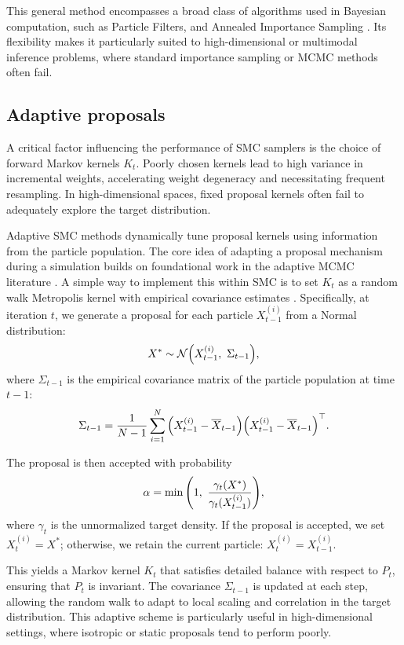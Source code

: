 \documentclass[a4paper, 12pt]{article}
\begin{document}
    This general method encompasses a broad class of algorithms used in Bayesian computation, such as Particle Filters, and Annealed Importance Sampling \citep{Neal2001}. Its flexibility makes it particularly suited to high-dimensional or multimodal inference problems, where standard importance sampling or MCMC methods often fail.

    \subsection{Adaptive proposals}

    A critical factor influencing the performance of SMC samplers is the choice of forward Markov kernels $K_t$. Poorly chosen kernels lead to high variance in incremental weights, accelerating weight degeneracy and necessitating frequent resampling. In high-dimensional spaces, fixed proposal kernels often fail to adequately explore the target distribution.

    Adaptive SMC methods dynamically tune proposal kernels using information from the particle population. The core idea of adapting a proposal mechanism during a simulation builds on foundational work in the adaptive MCMC literature \citep{Haario2001, Andrieu2006}. A simple way to implement this within SMC is to set $K_t$ as a random walk Metropolis kernel with empirical covariance estimates \citep{Jasra2011}. Specifically, at iteration $t$, we generate a proposal for each particle $X_{t-1}^{(i)}$ from a Normal distribution:
    \[
        X^* \sim \mathcal{N}\qty(X_{t-1}^{(i)},\ \Sigma_{t-1}),
    \]
    where $\Sigma_{t-1}$ is the empirical covariance matrix of the particle population at time $t-1$:
    \[
        \Sigma_{t-1} = \frac{1}{N-1} \sum_{i=1}^N \qty(X_{t-1}^{(i)} - \overline{X}_{t-1})\qty(X_{t-1}^{(i)} - \overline{X}_{t-1})^\top.
    \]

    The proposal is then accepted with probability
    \[
        \alpha = \min\qty(1,\ \frac{\gamma_t(X^\ast)}{\gamma_t(X_{t-1}^{(i)})}),
    \]
    where $\gamma_t$ is the unnormalized target density. If the proposal is accepted, we set $X_t^{(i)} = X^\ast$; otherwise, we retain the current particle: $X_t^{(i)} = X_{t-1}^{(i)}$.

    This yields a Markov kernel $K_t$ that satisfies detailed balance with respect to $P_t$, ensuring that $P_t$ is invariant. The covariance $\Sigma_{t-1}$ is updated at each step, allowing the random walk to adapt to local scaling and correlation in the target distribution. This adaptive scheme is particularly useful in high-dimensional settings, where isotropic or static proposals tend to perform poorly.
        
\end{document}

